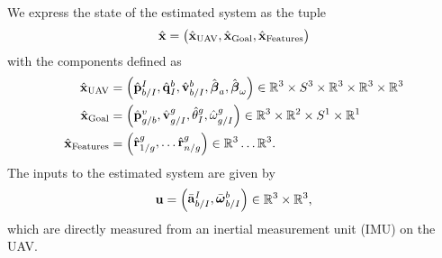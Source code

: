 
We express the state of the estimated system as the tuple
\begin{equation*}
  \hat{\boldsymbol{\mathrm{x}}} =
  \begin{pmatrix}
    \hat{\boldsymbol{\mathrm{x}}}_{\text{UAV}}, \hat{\boldsymbol{\mathrm{x}}}_{\text{Goal}}, \hat{\boldsymbol{\mathrm{x}}}_{\text{Features}}
  \end{pmatrix}
\end{equation*}
with the components defined as
\begin{align*}
  \hat{\boldsymbol{\mathrm{x}}}_{\text{UAV}} &=
  \begin{pmatrix}
    \hat{\boldsymbol{\mathrm{p}}}_{b/I}^{I}, \hat{\boldsymbol{\mathrm{q}}}_I^{b}, \hat{\boldsymbol{\mathrm{v}}}_{b/I}^b,
    \hat{\boldsymbol{\mathrm{\beta}}}_a,
    \hat{\boldsymbol{\mathrm{\beta}}}_{\omega}
  \end{pmatrix}
  \in \mathbb{R}^3 \times S^3 \times \mathbb{R}^3 \times \mathbb{R}^3 \times
    \mathbb{R}^3  \\
    \hat{\boldsymbol{\mathrm{x}}}_{\text{Goal}} & =
    \begin{pmatrix}
      \hat{\boldsymbol{\mathrm{p}}}_{g/b}^{v}, \hat{\boldsymbol{\mathrm{v}}}_{g/I}^{g}, \hat{\theta}_{I}^{g},
      \hat{\omega}_{g/I}^{g}
    \end{pmatrix}
    \in \mathbb{R}^3 \times \mathbb{R}^2 \times S^1 \times \mathbb{R}^1
    \\
    \hat{\boldsymbol{\mathrm{x}}}_{\text{Features}} & =
    \begin{pmatrix}
      \hat{\boldsymbol{\mathrm{r}}}_{1/g}^{g}, \dots \hat{\boldsymbol{\mathrm{r}}}_{n/g}^{g}
    \end{pmatrix}
    \in \mathbb{R}^3 \dots \mathbb{R}^3.
\end{align*}
The inputs to the estimated system are given by
\begin{equation*}
  \boldsymbol{\mathrm{u}} = \begin{pmatrix} \bar{\boldsymbol{\mathrm{a}}}_{b/I}^I, \bar{\boldsymbol{\mathrm{\omega}}}_{b/I}^b \end{pmatrix} \in
        \mathbb{R}^3 \times \mathbb{R}^3,
\end{equation*}
which are directly measured from an inertial measurement unit (IMU) on the UAV.

